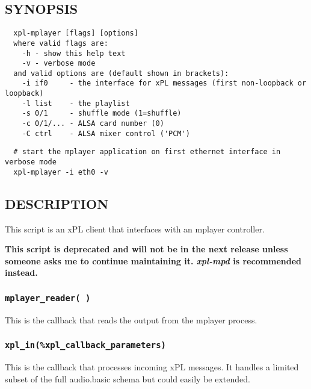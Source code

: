 \subsection*{SYNOPSIS\label{xpl-mplayer_SYNOPSIS}}
\begin{verbatim}
  xpl-mplayer [flags] [options]
  where valid flags are:
    -h - show this help text
    -v - verbose mode
  and valid options are (default shown in brackets):
    -i if0     - the interface for xPL messages (first non-loopback or loopback)
    -l list    - the playlist
    -s 0/1     - shuffle mode (1=shuffle)
    -c 0/1/... - ALSA card number (0)
    -C ctrl    - ALSA mixer control ('PCM')
\end{verbatim}
\begin{verbatim}
  # start the mplayer application on first ethernet interface in verbose mode
  xpl-mplayer -i eth0 -v
\end{verbatim}
\subsection*{DESCRIPTION\label{xpl-mplayer_DESCRIPTION}}


This script is an xPL client that interfaces with an mplayer controller.



\textbf{This script is deprecated and will not be in the next release unless
someone asks me to continue maintaining it.  \emph{xpl-mpd} is recommended
instead.}

\subsubsection*{\texttt{mplayer\_reader( )}\label{xpl-mplayer_mplayer_reader_}}


This is the callback that reads the output from the mplayer process.

\subsubsection*{\texttt{xpl\_in(\%xpl\_callback\_parameters)}\label{xpl-mplayer_xpl_in_xpl_callback_parameters_}}


This is the callback that processes incoming xPL messages.  It handles
a limited subset of the full audio.basic schema but could easily be
extended.

